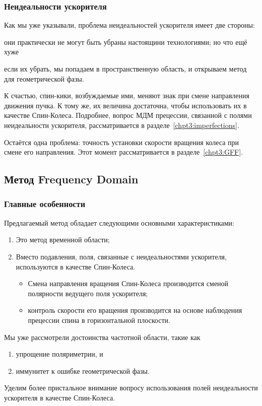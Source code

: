 \subsubsection{Неидеальности ускорителя}
Как мы уже указывали, проблема неидеальностей ускорителя имеет две стороны:
\begin{enumerate*}
	\item они практически не могут быть убраны настоящини технологиями; но что ещё хуже
	\item если их убрать, мы попадаем в пространственную область, и открываем метод для геометрической фазы.
\end{enumerate*}

К счастью, спин-кики, возбуждаемые ими, меняют знак при смене направления движения пучка. К тому же,
их величина достаточна, чтобы использовать их в качестве Спин-Колеса. Подробнее, вопрос МДМ прецессии, связанной с полями неидеальности ускорителя, рассматривается в разделе~\ref{chpt3:imperfections}.

Остаётся одна проблема: точность установки скорости вращения колеса при смене его направления. Этот момент
рассматривается в разделе~\ref{chpt3:GFF}.

\subsection{Метод Frequency Domain}\label{sec:FDM_concept}
\subsubsection{Главные особенности}
Предлагаемый метод обладает следующими основными характеристиками:
\begin{enumerate}
	\item Это метод временной области;
	\item Вместо подавления, поля, связанные с неидеальностями ускорителя, используются в качестве Спин-Колеса.
	\begin{itemize}
		\item Смена направления вращения Спин-Колеса производится сменой полярности ведущего поля ускорителя;
		\item контроль скорости его вращения производится на основе наблюдения прецессии спина в горизонтальной плоскости.
	\end{itemize}
\end{enumerate}

Мы уже рассмотрели достоинства частотной области, такие как 
\begin{enumerate}
	\item упрощение поляриметрии, и 
	\item иммунитет к ошибке геометрической фазы.
\end{enumerate}
Уделим более пристальное внимание вопросу использования полей неидеальности ускорителя в качестве Спин-Колеса.

